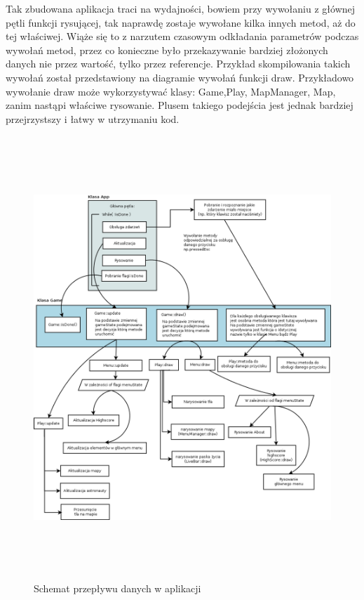 Tak zbudowana aplikacja traci na wydajności, bowiem przy wywołaniu z głównej pętli funkcji rysującej, tak naprawdę zostaje wywołane kilka innych metod, aż do tej właściwej. Wiąże się to z narzutem czasowym odkładania parametrów podczas wywołań metod, przez co konieczne było przekazywanie bardziej złożonych danych nie przez wartość, tylko przez referencje. Przykład skompilowania takich wywołań został przedstawiony na diagramie wywołań funkcji draw. Przykładowo wywołanie draw może wykorzystywać klasy: Game,Play, MapManager, Map, zanim nastąpi właściwe rysowanie. Plusem takiego podejścia jest jednak bardziej przejrzystszy i łatwy w utrzymaniu kod.
\begin{figure}[h]
    \centering
    \includegraphics[width=450px,height=630px]{./Pictures/warstwy.png}
    \caption{Schemat przepływu danych w aplikacji}
\end{figure}

